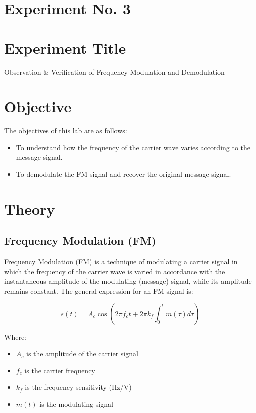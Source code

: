 \documentclass[a4paper,12pt]{article}
\begin{document}
	\section{Experiment No. 3}
	
	\section{Experiment Title }
Observation \& Verification of Frequency Modulation and Demodulation
	\section{Objective}
	

	
The objectives of this lab are as follows:
\begin{itemize}
	\item To understand how the frequency of the carrier wave varies according to the message
	signal.
	\item To demodulate the FM signal and recover the original message signal.
\end{itemize}

	\section{Theory}
	
	\subsection{Frequency Modulation (FM)}
	
	Frequency Modulation (FM) is a technique of modulating a carrier signal in which the frequency of the carrier wave is varied in accordance with the instantaneous amplitude of the modulating (message) signal, while its amplitude remains constant. The general expression for an FM signal is:
	
	\begin{equation}
		s(t) = A_c \cos\left(2\pi f_c t + 2\pi k_f \int_0^t m(\tau) d\tau \right)
		\label{eq:fm_signal}
	\end{equation}
	
	Where:
	\begin{itemize}
		\item $A_c$ is the amplitude of the carrier signal
		\item $f_c$ is the carrier frequency
		\item $k_f$ is the frequency sensitivity (Hz/V)
		\item $m(t)$ is the modulating signal
	\end{itemize}
	
\end{document}
